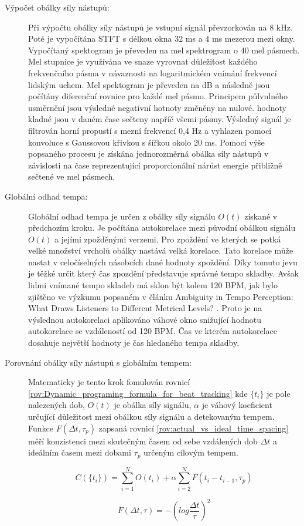     \begin{description}
      \item[Výpočet obálky síly nástupů:] Při výpočtu obálky síly nástupů je vstupní signál převzorkován na 8 kHz. Poté je vypočítána \acs{STFT} s délkou okna 32 ms a 4 ms mezerou mezi okny. Vypočítaný spektogram je převeden na mel spektrogram o 40 mel pásmech. Mel stupnice je využívána ve snaze vyrovnat důležitost každého frekvenčního pásma v návaznosti na logaritmickém vnímání frekvencí lidským uchem. Mel spektogram je převeden na dB a následně jsou počítány diferenční rovnice pro každé mel pásmo. Principem půlvnlného usměrnění jsou výsledné negativní hotnoty změněny na nulové. hodnoty kladné jsou v daném čase sečteny napříč všemi pásmy. Výsledný signál je filtrován horní propustí s mezní frekvencí 0,4 Hz a vyhlazen pomocí konvoluce s Gaussovou křivkou s šířkou okolo 20 ms. Pomocí výše popsaného procesu je získána jednorozměrná obálka síly nástupů v závislosti na čase reprezentující proporcionální nárůst energie přibližně sečtené ve mel pásmech.
      \item[Globální odhad tempa:] Globální odhad tempa je určen z obálky síly signálu $O(t)$ získané v předchozím kroku. Je počítána autokorelace mezi původní obálkou signálu $O(t)$ a jejími zpožděnými verzemi. Pro zpoždění ve kterých se potká velké množství vrcholů obálky nastává velká korelace. Tato korelace může nastat v celočíselných násobcích dané hodnoty zpoždění. Díky tomuto jevu je těžké určit který čas zpozdění představuje správné tempo skladby. Avšak lidmi vnímané tempo skladeb má sklon být kolem 120 \acs{BPM}, jak bylo zjištěno ve výzkumu popsaném v článku Ambiguity in Tempo Perception: What Draws Listeners to Different Metrical Levels? \cite{Ambiguity_in_tempo_perception}. Proto je na výslednou autokorelaci aplikováno váhové okno snižující hodnotu autokorelace se vzdáleností od 120 BPM. Čas ve kterém autokorelace dosahuje největší hodnoty je čas hledaného tempa skladby.  
      \item[Porovnání obálky síly nástupů s globálním tempem:] Matematicky je tento krok fomulován rovnicí \ref{rov:Dynamic_programing_formula_for_beat_tracking} kde $ \{t_i\} $ je pole nalezených dob, $O(t)$ je obálka síly signálu, $\alpha$ je váhový koeficient určující důležitost mezi obálkou síly signálu a detekovaným tempem. Funkce $F(\Delta t, \tau_p)$ zapsaná rovnicí \ref{rov:actual_vs_ideal_time_spacing} měří konzistenci mezi skutečným časem od sebe vzdálených dob $\Delta t$ a ideálním časem mezi dobami $ \tau_p$ určeným cílovým tempem.

      \begin{equation}
        C(\{t_i\}) = \sum_{i = 1}^{N} O(t_i) + \alpha \sum_{i = 2}^{N} F(t_i - t_{i-1}, \tau_p)
        \label{rov:Dynamic_programing_formula_for_beat_tracking}
      \end{equation}
  
      \begin{equation}
        F(\Delta t, \tau) = -(log \frac{\Delta t}{\tau})^2
        \label{rov:actual_vs_ideal_time_spacing}
      \end{equation}
    \end{description}

